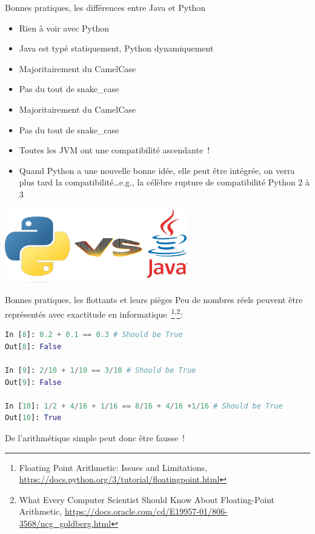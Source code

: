 \documentclass{beamer}
\begin{document}
    \begin{frame}{Bonnes pratiques, les différences entre Java et Python}

        \begin{itemize}

            \item Rien à voir avec Python
            \item Java est typé statiquement, Python dynamiquement
            \item Majoritairement du CamelCase
            \item Pas du tout de snake\_case
            \item Majoritairement du CamelCase
            \item Pas du tout de snake\_case
            \item Toutes les JVM ont une compatibilité ascendante~!
            \item Quand Python a une nouvelle bonne idée, elle peut être intégrée, on verra plus tard la compatibilité\ldots e.g., la célèbre rupture de compatibilité Python 2 à 3

        \end{itemize}

        \centering
        \includegraphics[width=8cm]{image/Java-vs-Python}

    \end{frame}

    \begin{frame}[fragile]{Bonnes pratiques, les flottants et leurs pièges}
        \pause
        Peu de nombres réels peuvent être représentés avec exactitude en informatique~\footnote{Floating Point Arithmetic: Issues and Limitations, \url{https://docs.python.org/3/tutorial/floatingpoint.html}}\textsuperscript{,}\footnote{What Every Computer Scientist Should Know About Floating-Point Arithmetic, \url{https://docs.oracle.com/cd/E19957-01/806-3568/ncg_goldberg.html}}:

        \begin{lstlisting}[language=python]
In [8]: 0.2 + 0.1 == 0.3 # Should be True
Out[8]: False

In [9]: 2/10 + 1/10 == 3/10 # Should be True
Out[9]: False

In [10]: 1/2 + 4/16 + 1/16 == 8/16 + 4/16 +1/16 # Should be True
Out[10]: True
        \end{lstlisting}

        De l'arithmétique simple peut donc être fausse~!
    \end{frame}
\end{document}
